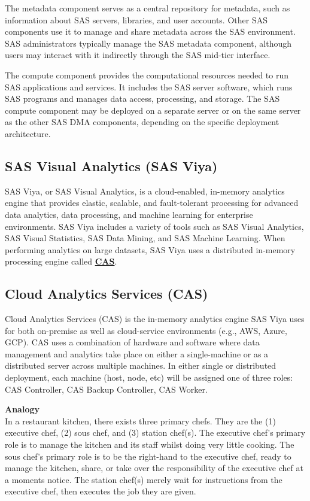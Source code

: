 The metadata component serves as a central repository for metadata, such as information about SAS servers, libraries, and user accounts. Other SAS components use it to manage and share metadata across the SAS environment. SAS administrators typically manage the SAS metadata component, although users may interact with it indirectly through the SAS mid-tier interface.

The compute component provides the computational resources needed to run SAS applications and services. It includes the SAS server software, which runs SAS programs and manages data access, processing, and storage. The SAS compute component may be deployed on a separate server or on the same server as the other SAS DMA components, depending on the specific deployment architecture.

\subsection{SAS Visual Analytics (SAS Viya)}
SAS Viya, or SAS Visual Analytics, is a cloud-enabled, in-memory analytics engine that provides elastic, scalable, and fault-tolerant processing for advanced data analytics, data processing, and machine learning for enterprise environments. SAS Viya includes a variety of tools such as SAS Visual Analytics, SAS Visual Statistics, SAS Data Mining, and SAS Machine Learning. When performing analytics on large datasets, SAS Viya uses a distributed in-memory processing engine called \href{https://documentation.sas.com/doc/en/calcdc/3.3/calserverscas/n05000viyaservers000000admin.htm}{\textbf{CAS}}.

\subsection{Cloud Analytics Services (CAS)}
Cloud Analytics Services (CAS) is the in-memory analytics engine SAS Viya uses for both on-premise as well as cloud-service environments (e.g., AWS, Azure, GCP). CAS uses a combination of hardware and software where data management and analytics take place on either a single-machine or as a distributed server across multiple machines. In either single or distributed deployment, each machine (host, node, etc) will be assigned one of three roles: CAS Controller, CAS Backup Controller, CAS Worker.

\textbf{Analogy}
\\
In a restaurant kitchen, there exists three primary chefs. They are the (1) executive chef, (2) sous chef, and (3) station chef(s). The executive chef's primary role is to manage the kitchen and its staff whilst doing very little cooking. The sous chef's primary role is to be the right-hand to the executive chef, ready to manage the kitchen, share, or take over the responsibility of the executive chef at a moments notice. The station chef(s) merely wait for instructions from the executive chef, then executes the job they are given. 

